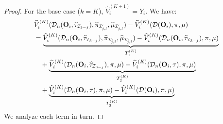 \documentclass[11pt]{article}
\theoremstyle{referenceplain}
\theoremstyle{referencedefinition}
\theoremstyle{referenceremark}
\begin{document}
\begin{proof}
For the base case ($k = K$), $\widehat{V}_i^{(K+1)} = Y_i$. We have:
\begin{align}
    &\widehat{V}_i^{(K)}(\mathcal{D}_n(\mathbf{O}_i,\widehat{\tau}_{\mathcal{I}_{3-j}}),\widehat{\pi}_{\mathcal{I}_{j,l}^c},\widehat{\mu}_{\mathcal{I}_{j,l}^c}) - \widehat{V}_i^{(K)}(\mathcal{D}(\mathbf{O}_i),\pi,\mu)\notag\\
    &= \underbrace{\widehat{V}_i^{(K)}(\mathcal{D}_n(\mathbf{O}_i,\widehat{\tau}_{\mathcal{I}_{3-j}}),\widehat{\pi}_{\mathcal{I}_{j,l}^c},\widehat{\mu}_{\mathcal{I}_{j,l}^c}) - \widehat{V}_i^{(K)}(\mathcal{D}_n(\mathbf{O}_i,\widehat{\tau}_{\mathcal{I}_{3-j}}),\pi,\mu)}_{T_1^{(K)}}\label{multi-base-T1}\\
    &\quad + \underbrace{\widehat{V}_i^{(K)}(\mathcal{D}_n(\mathbf{O}_i,\widehat{\tau}_{\mathcal{I}_{3-j}}),\pi,\mu) - \widehat{V}_i^{(K)}(\mathcal{D}_n(\mathbf{O}_i,\tau),\pi,\mu)}_{T_2^{(K)}}\label{multi-base-T2}\\
    &\quad + \underbrace{\widehat{V}_i^{(K)}(\mathcal{D}_n(\mathbf{O}_i,\tau),\pi,\mu) - \widehat{V}_i^{(K)}(\mathcal{D}(\mathbf{O}_i),\pi,\mu)}_{T_3^{(K)}}\label{multi-base-T3}
\end{align}
We analyze each term in turn.


\end{proof}
\end{document}
